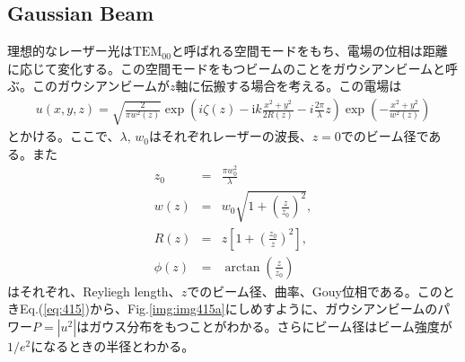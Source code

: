 \subsection{Gaussian Beam}
理想的なレーザー光は$\mathrm{TEM}_{00}$と呼ばれる空間モードをもち、電場の位相は距離に応じて変化する。この空間モードをもつビームのことをガウシアンビームと呼ぶ。このガウシアンビームが$z$軸に伝搬する場合を考える。この電場は
\begin{eqnarray}
  u(x, y, z)=\sqrt{\frac{2}{\pi{w^2(z)}}} \exp \left(i\zeta(z)-\mathrm{i} k \frac{x^{2} +y^{2}}{2 R(z)}-i\frac{2\pi}{\lambda}z\right)
  \exp \left(-\frac{x^{2}+y^{2}}{w^{2}(z)}\right)  \label{eq:eq415}
\end{eqnarray}
とかける\cite{bond2016interferometer,svelto1998principles}。ここで、$\lambda,\,w_0$はそれぞれレーザーの波長、$z=0$でのビーム径である。また
\begin{eqnarray}
  z_0 &=& \frac{\pi{w^2_0}}{\lambda} \\ \label{eq:eq415_a}
  w(z) &=& w_0\sqrt{1+\left(\frac{z}{z_0}\right)^2}, \\ \label{eq:eq415_b}
  R(z) &=& z\left[1+\left(\frac{z_0}{z}\right)^2\right],\\ \label{eq:eq415_c}
  \phi(z) &=& \arctan\left(\frac{z}{z_0}\right) \label{eq:eq415_d}
\end{eqnarray}
はそれぞれ、Reyliegh length、$z$でのビーム径、曲率、Gouy位相である。このときEq.(\ref{eq:415})から、Fig.\ref{img:img415a}にしめすように、ガウシアンビームのパワー$P=|u^2|$はガウス分布をもつことがわかる。さらにビーム径はビーム強度が$1/e^2$になるときの半径とわかる。

